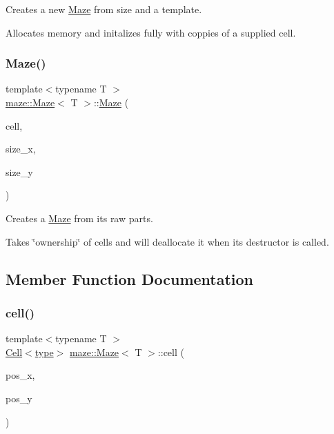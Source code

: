 Creates a new \hyperlink{classmaze_1_1Maze}{Maze} from size and a template. 

Allocates memory and initalizes fully with coppies of a supplied cell. \mbox{\label{classmaze_1_1Maze_a703176967ecf07e5a2de6fc28f1cfa04}} 
\subsubsection{\texorpdfstring{Maze()}{Maze()}\hspace{0.1cm}{\footnotesize\ttfamily [3/3]}}
{\footnotesize\ttfamily template$<$typename T $>$ \\
\hyperlink{classmaze_1_1Maze}{maze\+::\+Maze}$<$ T $>$\+::\hyperlink{classmaze_1_1Maze}{Maze} (\begin{DoxyParamCaption}\item[{\hyperlink{classmaze_1_1RawCell}{Raw\+Cell}$<$ \hyperlink{classmaze_1_1Maze_a9f056be7a10507d578e4608e31a3d6fc}{type} $>$ $\ast$}]{cell,  }\item[{\hyperlink{namespacemaze_ae8120a098fabafbbfa264a3c619640b3}{index}}]{size\+\_\+x,  }\item[{\hyperlink{namespacemaze_ae8120a098fabafbbfa264a3c619640b3}{index}}]{size\+\_\+y }\end{DoxyParamCaption})}



Creates a \hyperlink{classmaze_1_1Maze}{Maze} from its raw parts. 

Takes \char`\"{}ownership\char`\"{} of {\ttfamily cells} and will deallocate it when it\textquotesingle{}s destructor is called. 

\subsection{Member Function Documentation}
\mbox{\label{classmaze_1_1Maze_ae538f5777c03216dddbdbd8da5623ca9}} 
\subsubsection{\texorpdfstring{cell()}{cell()}}
{\footnotesize\ttfamily template$<$typename T $>$ \\
\hyperlink{classmaze_1_1Cell}{Cell}$<$\hyperlink{classmaze_1_1Maze_a9f056be7a10507d578e4608e31a3d6fc}{type}$>$ \hyperlink{classmaze_1_1Maze}{maze\+::\+Maze}$<$ T $>$\+::cell (\begin{DoxyParamCaption}\item[{\hyperlink{namespacemaze_ae8120a098fabafbbfa264a3c619640b3}{index}}]{pos\+\_\+x,  }\item[{\hyperlink{namespacemaze_ae8120a098fabafbbfa264a3c619640b3}{index}}]{pos\+\_\+y }\end{DoxyParamCaption})}



